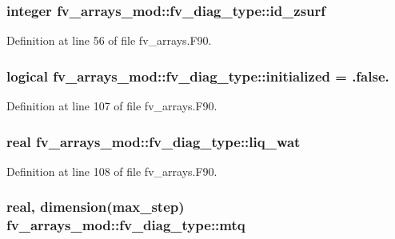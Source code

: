 \subsubsection[{id\-\_\-zsurf}]{\setlength{\rightskip}{0pt plus 5cm}integer fv\-\_\-arrays\-\_\-mod\-::fv\-\_\-diag\-\_\-type\-::id\-\_\-zsurf}\label{structfv__arrays__mod_1_1fv__diag__type_af1be4af4ae277430d4b2374cb2ebed5c}


Definition at line 56 of file fv\-\_\-arrays.\-F90.

\subsubsection[{initialized}]{\setlength{\rightskip}{0pt plus 5cm}logical fv\-\_\-arrays\-\_\-mod\-::fv\-\_\-diag\-\_\-type\-::initialized = .false.}\label{structfv__arrays__mod_1_1fv__diag__type_ae727b4a8b7bcd2d4ca2e51fd71fe93c5}


Definition at line 107 of file fv\-\_\-arrays.\-F90.

\subsubsection[{liq\-\_\-wat}]{\setlength{\rightskip}{0pt plus 5cm}real fv\-\_\-arrays\-\_\-mod\-::fv\-\_\-diag\-\_\-type\-::liq\-\_\-wat}\label{structfv__arrays__mod_1_1fv__diag__type_a762e21ac20112fb7a5e3b7ea5f14c0ff}


Definition at line 108 of file fv\-\_\-arrays.\-F90.

\subsubsection[{mtq}]{\setlength{\rightskip}{0pt plus 5cm}real, dimension({\bf max\-\_\-step}) fv\-\_\-arrays\-\_\-mod\-::fv\-\_\-diag\-\_\-type\-::mtq}\label{structfv__arrays__mod_1_1fv__diag__type_a26ee238f8ade03f3f0b266664416b8f8}


